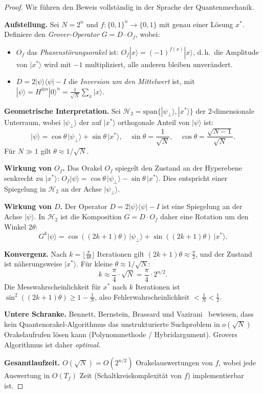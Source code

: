﻿\documentclass[a4paper,12pt]{article}
\theoremstyle{definition}
\begin{document}
\begin{proof}
Wir führen den Beweis vollständig in der Sprache der Quantenmechanik.

\textbf{Aufstellung.}
Sei $N = 2^n$ und $f: \{0,1\}^n \to \{0,1\}$ mit genau einer Lösung $x^*$.
Definiere den \emph{Grover-Operator} $G = D \cdot O_f$, wobei:
\begin{itemize}
\item $O_f$ das \emph{Phasenstörungsorakel} ist:
  $O_f |x\rangle = (-1)^{f(x)} |x\rangle$, d.\,h.\ die Amplitude von $|x^*\rangle$
  wird mit $-1$ multipliziert, alle anderen bleiben unverändert.
\item $D = 2|\psi\rangle\langle\psi| - I$ die \emph{Inversion um den Mittelwert} ist,
  mit $|\psi\rangle = H^{\otimes n}|0\rangle^n = \frac{1}{\sqrt{N}}\sum_{x}|x\rangle$.
\end{itemize}

\textbf{Geometrische Interpretation.}
Sei $\mathcal{H}_2 = \mathrm{span}\{|\psi_\perp\rangle, |x^*\rangle\}$ der
2-dimensionale Unterraum, wobei $|\psi_\perp\rangle$ der auf $|x^*\rangle$
orthogonale Anteil von $|\psi\rangle$ ist:
\[
  |\psi\rangle = \cos\theta\,|\psi_\perp\rangle + \sin\theta\,|x^*\rangle,
  \quad \sin\theta = \frac{1}{\sqrt{N}}, \quad \cos\theta = \frac{\sqrt{N-1}}{\sqrt{N}}.
\]
Für $N \gg 1$ gilt $\theta \approx 1/\sqrt{N}$.

\textbf{Wirkung von $O_f$.}
Das Orakel $O_f$ spiegelt den Zustand an der Hyperebene senkrecht zu $|x^*\rangle$:
$O_f |\psi\rangle = \cos\theta\,|\psi_\perp\rangle - \sin\theta\,|x^*\rangle$.
Dies entspricht einer Spiegelung in $\mathcal{H}_2$ an der Achse $|\psi_\perp\rangle$.

\textbf{Wirkung von $D$.}
Der Operator $D = 2|\psi\rangle\langle\psi| - I$ ist eine Spiegelung an der
Achse $|\psi\rangle$. In $\mathcal{H}_2$ ist die Komposition $G = D \cdot O_f$
daher eine Rotation um den Winkel $2\theta$:
\[
  G^k |\psi\rangle = \cos((2k+1)\theta)\,|\psi_\perp\rangle
                   + \sin((2k+1)\theta)\,|x^*\rangle.
\]

\textbf{Konvergenz.}
Nach $k = \lfloor \frac{\pi}{4\theta} \rfloor$ Iterationen gilt
$(2k+1)\theta \approx \frac{\pi}{2}$, und der Zustand ist näherungsweise $|x^*\rangle$.
Für kleine $\theta \approx 1/\sqrt{N}$:
\[
  k \approx \frac{\pi}{4} \cdot \sqrt{N} = \frac{\pi}{4} \cdot 2^{n/2}.
\]
Die Messwahrscheinlichkeit für $x^*$ nach $k$ Iterationen ist
$\sin^2((2k+1)\theta) \geq 1 - \frac{1}{N}$, also Fehlerwahrscheinlichkeit
$< \frac{1}{N} < \frac{1}{2}$.

\textbf{Untere Schranke.}
Bennett, Bernstein, Brassard und Vazirani~\cite{Gro96} bewiesen, dass kein
Quantenorakel-Algorithmus das unstrukturierte Suchproblem in $o(\sqrt{N})$
Orakelaufrufen lösen kann (Polynommethode / Hybridargument). Grovers Algorithmus
ist daher \emph{optimal}.

\textbf{Gesamtlaufzeit.}
$O(\sqrt{N}) = O(2^{n/2})$ Orakelauswertungen von $f$, wobei jede Auswertung
in $O(T_f)$ Zeit (Schaltkreiskomplexität von $f$) implementierbar ist.
\end{proof}
\end{document}
